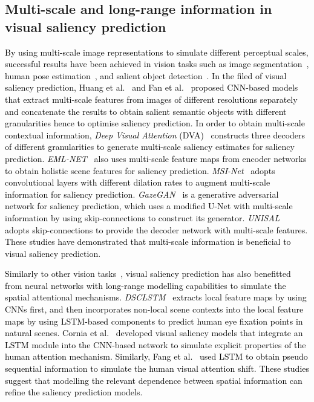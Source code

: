 \documentclass{article}
\begin{document}
\subsection{Multi-scale and long-range information in visual saliency prediction}
\label{sec:multiscale}
\textcolor{black}{
By using multi-scale image representations to simulate different perceptual scales, successful results have been achieved in vision tasks such as image segmentation~\cite{unet}, human pose estimation~\cite{HRN}, and salient object detection~\cite{8782147}. In the filed of visual saliency prediction, Huang et al.~\cite{Huang_2015} and Fan et al.~\cite{CASNET2} proposed CNN-based models that extract multi-scale features from images of different resolutions separately and concatenate the results to obtain salient semantic objects with different granularities hence to optimise saliency prediction.
In order to obtain multi-scale contextual information, \textit{Deep Visual Attention} (DVA)~\cite{DVA_Wang} constructs three decoders of different granularities to generate multi-scale saliency estimates for saliency prediction.
\textit{EML-NET}~\cite{EML-NET} also uses multi-scale feature maps from encoder networks to obtain holistic scene features for saliency prediction.
\textit{MSI-Net}~\cite{MSI-Net} adopts convolutional layers with different dilation rates to augment multi-scale information for saliency prediction.
\textit{GazeGAN}~\cite{GAZEGAN} is a generative adversarial network for saliency prediction, which uses a modified U-Net with multi-scale information by using skip-connections to construct its generator.
\textit{UNISAL}~\cite{UNISAL} adopts skip-connections to provide the decoder network with multi-scale features. These studies have demonstrated that multi-scale information is beneficial to visual saliency prediction.} 

\textcolor{black}{
Similarly to other vision tasks~\cite{Visual_Saliency_Transformer,Rthnk_ss_cvpr2021}, visual saliency prediction has also benefitted from neural networks with long-range modelling capabilities to simulate the spatial attentional mechanisms.
\textit{DSCLSTM}~\cite{DSCLSTM} extracts local feature maps by using CNNs first, and then incorporates non-local scene contexts into the local feature maps by using LSTM-based components to predict human eye fixation points in natural scenes.
Cornia et al.~\cite{SAM_Cornia} developed visual saliency models that integrate an LSTM module into the CNN-based network to simulate explicit properties of the human attention mechanism. 
Similarly, Fang et al.~\cite{FANG_LSTM} used LSTM to obtain pseudo sequential information to simulate the human visual attention shift.
These studies suggest that modelling the relevant dependence between spatial information can refine the saliency prediction models.}
\end{document}
